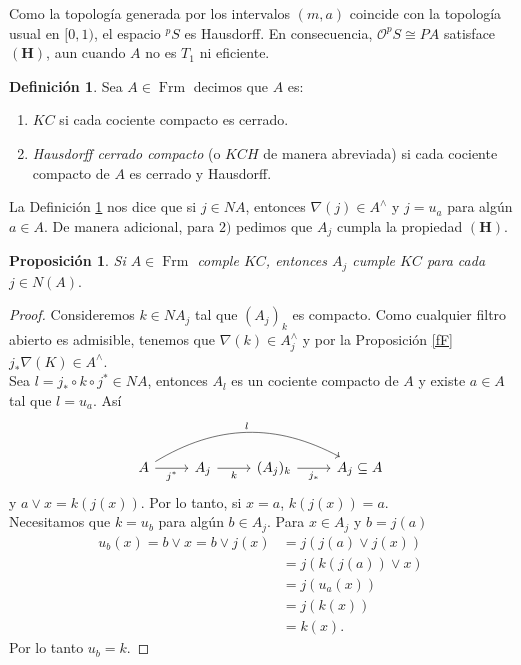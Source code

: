 \documentclass[11pt]{amsart}
\DeclareMathOperator{\Frm}{Frm}
\theoremstyle{plain}
\newtheorem{prop}[thm]{Proposición}
\theoremstyle{definition}
\newtheorem{dfn}[thm]{Definición}
\begin{document}
Como la topología generada por los intervalos $(m,a)$ coincide con la topología usual en $[0,1)$, el espacio $^pS$ es Hausdorff. En consecuencia, $\mathcal{O}^pS\cong PA$ satisface $\mathbf{(H)}$, aun cuando $A$ no es $T_1$ ni eficiente.

\begin{dfn}\label{KC y KCH}
Sea $A\in \Frm$ decimos que $A$ es:
\begin{enumerate}
    \item $KC$ si cada cociente compacto es cerrado.

    \item \emph{Hausdorff cerrado compacto} (o $KCH$ de manera abreviada) si cada cociente compacto de $A$ es cerrado y Hausdorff.
\end{enumerate}
\end{dfn}

La Definición \ref{KC y KCH} nos dice que si $j\in NA$, entonces $\nabla(j)\in A^\wedge$ y $j=u_a$ para algún $a\in A$. De manera adicional, para $2)$ pedimos que $A_j$ cumpla la propiedad $\mathbf{(H)}$.\\

\begin{prop}\label{KCquout}
    Si $A\in \Frm$ comple $KC$, entonces $A_j$ cumple $KC$ para cada $j\in N(A).$
\end{prop}

\begin{proof} %
Consideremos $k\in NA_j$ tal que $(A_j)_k$ es compacto. 
Como cualquier filtro abierto es admisible, tenemos que $\nabla(k)\in A_j^\wedge$ 
y por la Proposición \ref{fF} $j_*\nabla(K)\in A^\wedge$.\\

Sea $l=j_*\circ  k\circ j^*\in NA$, entonces $A_l$ es un cociente compacto de $A$ y existe $a\in A$ tal que $l=u_a$. Así
\[
\begin{tikzcd}
	A \arrow[r, "j^*"'] \arrow[rrr, "l", bend left] & A_j \arrow[r, "k"'] & (A_j)_k \arrow[r, "j_*"'] & A_j\subseteq A
	\end{tikzcd}\]
y $a\vee x=k(j(x))$. Por lo tanto, si $x=a$, $k(j(x))=a$.\\

Necesitamos que $k=u_b$ para algún $b\in A_j$. Para $x\in A_j$ y $b=j(a)$
\[
\begin{split}
u_b(x)= b\vee x= b\vee j(x)& =j(j(a)\vee j(x))\\
& =j(k(j(a))\vee x)\\
& =j(u_a(x))\\
& =j(k(x))\\	
&=k(x).
\end{split}
\]
Por lo tanto $u_b=k$.
\end{proof}
\end{document}

